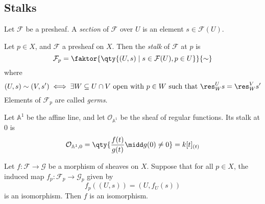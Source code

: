 \subsection{Stalks}
\begin{definition}
    Let \( \mathcal F \) be a presheaf.
    A \emph{section} of \( \mathcal F \) over \( U \) is an element \( s \in \mathcal F(U) \).
\end{definition}
\begin{definition}
    Let \( p \in X \), and \( \mathcal F \) a presheaf on \( X \).
    Then the \emph{stalk} of \( \mathcal F \) at \( p \) is
    \[ \mathcal F_p = \faktor{\qty{(U, s) \mid s \in \mathcal F(U), p \in U}}{\sim} \]
    where
    \[ (U, s) \sim (V, s') \iff \exists W \subseteq U \cap V \text{ open with } p \in W \text{ such that } \res^U_W s = \res^V_W s' \]
    Elements of \( \mathcal F_p \) are called \emph{germs}.
\end{definition}
\begin{example}
    Let \( \mathbb A^1 \) be the affine line, and let \( \mathcal O_{\mathbb A^1} \) be the sheaf of regular functions.
    Its stalk at 0 is
    \[ \mathcal O_{\mathbb A^1, 0} = \qty{\frac{f(t)}{g(t)} \midd g(0) \neq 0} = k[t]_{(t)} \]
\end{example}
\begin{proposition}
    Let \( f : \mathcal F \to \mathcal G \) be a morphism of sheaves on \( X \).
    Suppose that for all \( p \in X \), the induced map \( f_p : \mathcal F_p \to \mathcal G_p \) given by
    \[ f_p((U, s)) = (U, f_U(s)) \]
    is an isomorphism.
    Then \( f \) is an isomorphism.
\end{proposition}
